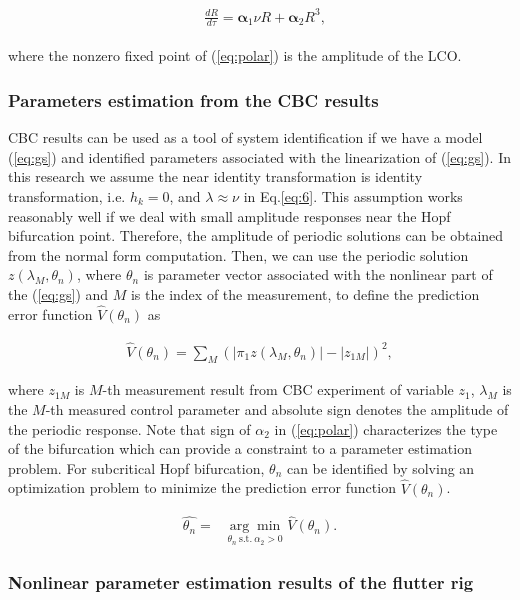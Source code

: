\documentclass[openacc]{rsproca_new}%
\theoremstyle{own}
\def\vec#1{\ensuremath{\mathbf{#1}}}
\newcommand{\Eref}[1]{(\ref{#1})}
\begin{document}
\begin{align}\label{eq:polar}
  \begin{split}
    &\frac{dR}{d\tau}=\vec{\alpha}_1 \nu R+\vec{\alpha}_2 R^3,
  \end{split}
\end{align}

\noindent where the nonzero fixed point of \Eref{eq:polar} is the amplitude of the LCO.


\subsubsection{Parameters estimation from the CBC results}\label{NSI}
CBC results can be used as a tool of system identification if we have a model \Eref{eq:gs} and identified parameters associated with the linearization of \Eref{eq:gs}. In this research we assume the near identity transformation is identity transformation, i.e. $h_k=0$, and $\lambda \approx \nu$ in Eq.\ref{eq:6}. This assumption works reasonably well if we deal with small amplitude responses near the Hopf bifurcation point. Therefore, the amplitude of periodic solutions can be obtained from the normal form computation. Then, we can use the periodic solution $z(\lambda_M,\theta_n)$, where $\theta_n$ is parameter vector associated with the nonlinear part of the \Eref{eq:gs} and $M$ is the index of the measurement, to define the prediction error function $\hat{V}(\theta_n)$ as

\begin{align}\label{NSI-2}
\hat{V}(\theta_n)= \sum_M (|\pi_1 z(\lambda_M,\theta_n)|-|z_{1M}|)^2,
\end{align}

\noindent where $z_{1M}$ is $M$-th measurement result from CBC experiment of variable $z_1$, $\lambda_M$ is the $M$-th measured control parameter and absolute sign denotes the amplitude of the periodic response. Note that sign of $\alpha_2$ in \Eref{eq:polar} characterizes the type of the bifurcation which can provide a constraint to a parameter estimation problem. For subcritical Hopf bifurcation, $\theta_n$ can be identified by solving an optimization problem to minimize the prediction error function $\hat{V}(\theta_n)$.

\begin{align}\label{NSI-3}
\hat{\theta_n}=&\underset{\theta_n \: \textrm{s.t.} \: \alpha_2>0} {\arg\min} \: \hat V(\theta_n).
\end{align}

\subsubsection{Nonlinear parameter estimation results of the flutter rig}\label{nonlinear}
\end{document}
